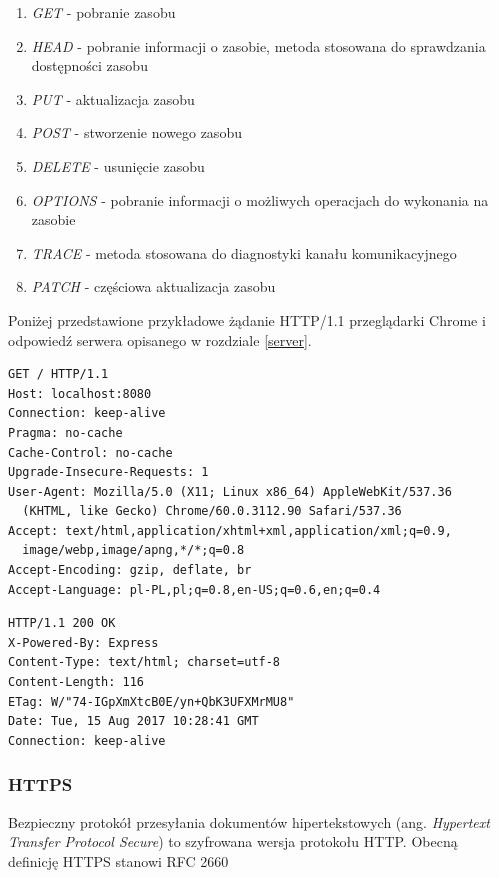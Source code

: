 \documentclass[polish, twoside, 12pt]{mwart}
\begin{document}
\begin{enumerate}
  \item \emph{GET} - pobranie zasobu
  \item \emph{HEAD} - pobranie informacji o zasobie, metoda stosowana do sprawdzania dostępności zasobu
  \item \emph{PUT} - aktualizacja zasobu
  \item \emph{POST} - stworzenie nowego zasobu
  \item \emph{DELETE} - usunięcie zasobu
  \item \emph{OPTIONS} - pobranie informacji o możliwych operacjach do wykonania na zasobie
  \item \emph{TRACE} - metoda stosowana do diagnostyki kanału komunikacyjnego
  \item \emph{PATCH} - częściowa aktualizacja zasobu
\end{enumerate}

Poniżej przedstawione przykładowe żądanie HTTP/1.1 przeglądarki Chrome i odpowiedź serwera opisanego w rozdziale \ref{server}.

\begin{lstlisting}[caption=Przykładowe żądanie HTTP/1.1,]
GET / HTTP/1.1
Host: localhost:8080
Connection: keep-alive
Pragma: no-cache
Cache-Control: no-cache
Upgrade-Insecure-Requests: 1
User-Agent: Mozilla/5.0 (X11; Linux x86_64) AppleWebKit/537.36 
  (KHTML, like Gecko) Chrome/60.0.3112.90 Safari/537.36
Accept: text/html,application/xhtml+xml,application/xml;q=0.9,
  image/webp,image/apng,*/*;q=0.8
Accept-Encoding: gzip, deflate, br
Accept-Language: pl-PL,pl;q=0.8,en-US;q=0.6,en;q=0.4
\end{lstlisting}

\begin{lstlisting}[caption=Przykładowa odpowiedź HTTP/1.1]
HTTP/1.1 200 OK
X-Powered-By: Express
Content-Type: text/html; charset=utf-8
Content-Length: 116
ETag: W/"74-IGpXmXtcB0E/yn+QbK3UFXMrMU8"
Date: Tue, 15 Aug 2017 10:28:41 GMT
Connection: keep-alive
\end{lstlisting}

\subsubsection{HTTPS} \label{https}

Bezpieczny protokół przesyłania dokumentów hipertekstowych (ang. \emph{Hypertext Transfer Protocol Secure}) to szyfrowana wersja protokołu HTTP. Obecną definicję HTTPS stanowi RFC 2660 \cite{rfc2660}
\end{document}
